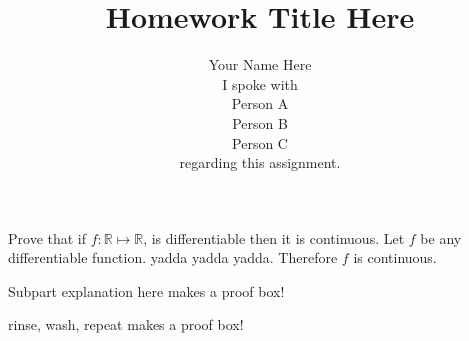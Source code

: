 \documentclass[11pt]{problemset}
\title{Homework Title Here}
\author{Your Name Here \vspace{1cm} \\ I spoke with  \\ Person A \\ Person B \\
Person C  \\regarding this assignment.}
\newcommand{\bbR}{\mathds{R}}
\newcommand{\<}{\langle}
\renewcommand{\>}{\rangle}
\begin{document}
\maketitle
\begin{problem}{1}
Prove that if $f: \bbR \mapsto \bbR$, is differentiable then it is continuous.
\solution
Let $f$ be any differentiable function. yadda yadda yadda. Therefore $f$ is
continuous.
\end{problem}
\begin{problem}{7}
\begin{problempart}{7.1}
Subpart explanation here
\solution
makes a proof box!
\end{problempart}
\begin{problempart}{7.2}
rinse, wash, repeat
\solution
makes a proof box!
\end{problempart}
\end{problem}
\end{document}
